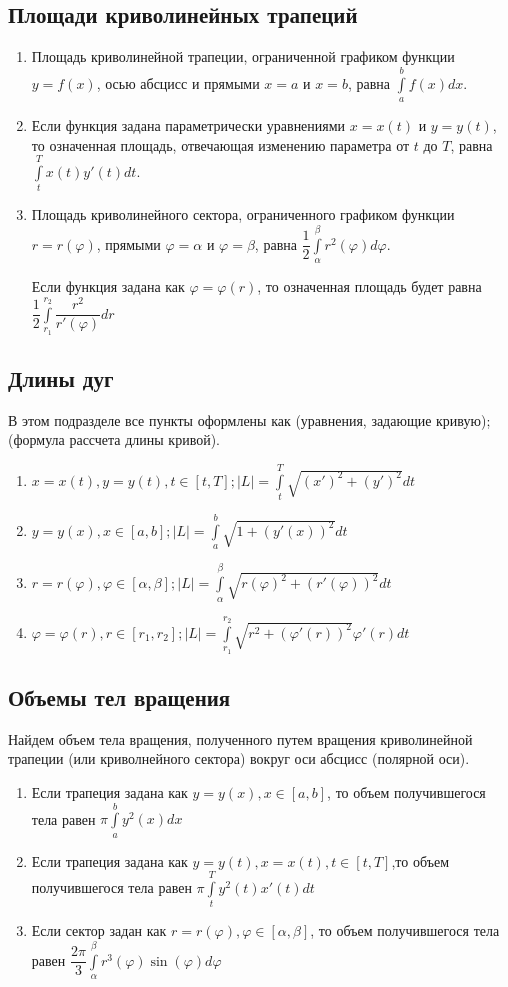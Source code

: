\documentclass[a4paper,12pt]{scrartcl}
\begin{document}
\subsection{Площади криволинейных трапеций}
\begin{enumerate}
\item Площадь криволинейной трапеции, ограниченной графиком функции $y = f(x)$, осью абсцисс и прямыми $x = a$ и $x=b$, равна $\int\limits_{a}^{b}f(x)dx$.
\item Если функция задана параметрически уравнениями $x=x(t)$ и $y=y(t)$, то означенная площадь, отвечающая изменению параметра от $t$ до $T$, равна $\int\limits_{t}^{T}x(t)y'(t)dt$.
\item Площадь криволинейного сектора, ограниченного графиком функции $r = r(\varphi)$, прямыми $\varphi = \alpha$ и $\varphi = \beta$, равна $\dfrac{1}{2}\int\limits_{\alpha}^{\beta}r^2(\varphi)d\varphi$.

 Если функция задана как $\varphi = \varphi (r)$, то означенная площадь будет равна $\dfrac{1}{2}\int\limits_{r_1}^{r_2}\dfrac{r^2}{r'(\varphi)}dr$
\end{enumerate}
\subsection{Длины дуг}
В этом подразделе все пункты оформлены как (уравнения, задающие кривую); (формула рассчета длины кривой).
\begin{enumerate}
\item $x = x(t),y=y(t),t\in[t,T]; |L| = \int\limits_{t}^{T}\sqrt{(x')^2 + (y')^2}dt$
\item $y = y(x), x\in[a,b]; |L| = \int\limits_{a}^{b}\sqrt{1 + (y'(x))^2}dt$
\item $r = r(\varphi), \varphi\in[\alpha,\beta]; |L| = \int\limits_{\alpha}^{\beta}\sqrt{r(\varphi)^2 + (r'(\varphi))^2}dt$
\item $ \varphi = \varphi(r), r\in[r_1,r_2]; |L| = \int\limits_{r_1}^{r_2}\sqrt{r^2 + (\varphi'(r))^2}\varphi'(r)dt$
\end{enumerate}

\subsection{Объемы тел вращения}
Найдем объем тела вращения, полученного путем вращения криволинейной  трапеции (или криволнейного сектора) вокруг оси абсцисс (полярной оси).
\begin{enumerate}
\item Если трапеция задана как $y = y(x), x\in [a,b]$, то объем получившегося тела равен $\pi\int\limits_{a}^{b}y^2(x)dx$
\item Если трапеция задана как $y = y(t), x = x(t), t\in[t,T]$,то объем получившегося тела равен $\pi\int\limits_{t}^{T}y^2(t)x'(t)dt$ 
\item Если сектор задан как $r =r(\varphi), \varphi \in[\alpha, \beta]$, то объем получившегося тела равен $\dfrac{2\pi}{3}\int\limits_{\alpha}^{\beta}r^3(\varphi)\sin(\varphi)d\varphi$ 
\end{enumerate}
\end{document}
